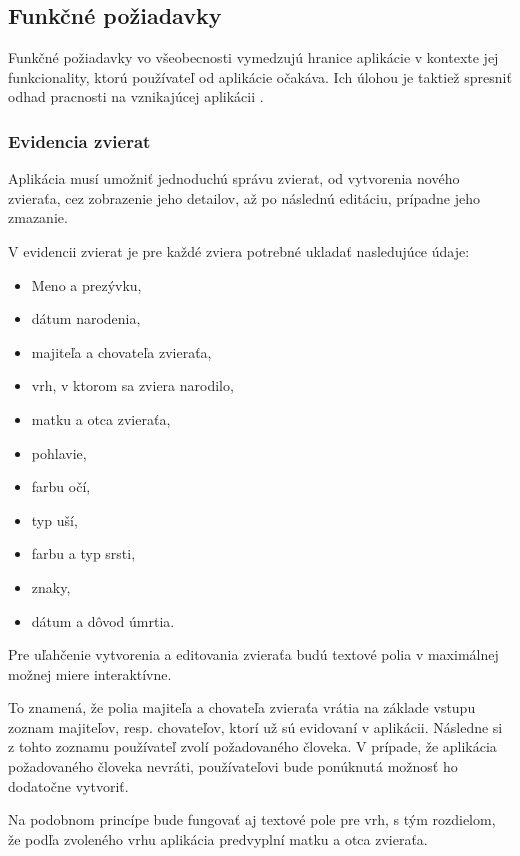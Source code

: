 \subsection{Funkčné požiadavky}\label{funkcne-poziadavky}
Funkčné požiadavky vo všeobecnosti vymedzujú hranice aplikácie v kontexte jej funkcionality, ktorú používateľ od aplikácie očakáva. Ich úlohou je taktiež spresniť odhad pracnosti na vznikajúcej aplikácii \cite{co-su-pripady-pouzitia}.

\subsubsection{Evidencia zvierat}\label{evidencia-zvierat}
Aplikácia musí umožniť jednoduchú správu zvierat, od vytvorenia nového zvieraťa, cez zobrazenie jeho detailov, až po následnú editáciu, prípadne jeho zmazanie.

\hfill \break
V evidencii zvierat je pre každé zviera potrebné ukladať nasledujúce údaje:

\begin{itemize}
	\item Meno a prezývku,
	\item dátum narodenia,
	\item majiteľa a chovateľa zvieraťa,
	\item vrh, v ktorom sa zviera narodilo,
	\item matku a otca zvieraťa,
	\item pohlavie,
	\item farbu očí,
	\item typ uší,
	\item farbu a typ srsti,
	\item znaky,
	\item dátum a dôvod úmrtia.
\end{itemize}

Pre uľahčenie vytvorenia a editovania zvieraťa budú textové polia v maximálnej možnej miere interaktívne.

To znamená, že polia majiteľa a chovateľa zvieraťa vrátia na základe vstupu zoznam majiteľov, resp. chovateľov, ktorí už sú evidovaní v aplikácii. Následne si z tohto zoznamu používateľ zvolí požadovaného človeka.
V prípade, že aplikácia požadovaného človeka nevráti, používateľovi bude ponúknutá možnosť ho dodatočne vytvoriť.

Na podobnom princípe bude fungovať aj textové pole pre vrh, s tým rozdielom, že podľa zvoleného vrhu aplikácia predvyplní matku a otca zvieraťa.
 
